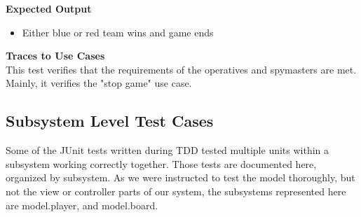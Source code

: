 \documentclass[12pt]{article}
\begin{document}
\noindent
{\bf Expected Output}
\begin{itemize}
    \item Either blue or red team wins and game ends
\end{itemize}

\noindent
{\bf Traces to Use Cases}\\
This test verifies that the requirements of the operatives and spymasters are met. Mainly, it verifies the "stop game" use case.


\subsection{Subsystem Level Test Cases}
Some of the JUnit tests written during TDD tested multiple units within a subsystem working correctly together. Those tests are documented here, organized by subsystem. As we were instructed to test the model thoroughly, but not the view or controller parts of our system, the subsystems represented here are model.player, and model.board.
\end{document}
